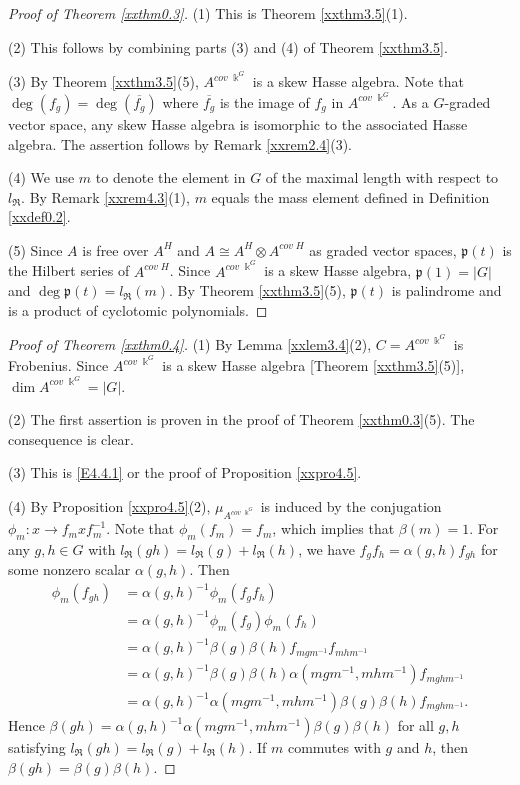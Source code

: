 \begin{proof}[Proof of Theorem \ref{xxthm0.3}]
(1) This is Theorem \ref{xxthm3.5}(1).

(2) This follows by combining parts (3) and (4) 
of Theorem \ref{xxthm3.5}.

(3) By Theorem \ref{xxthm3.5}(5), $A^{cov\; \Bbbk^G}$
is a skew Hasse algebra. Note that $\deg (f_g)=
\deg (\overline{f_g})$ where $\overline{f_g}$ is
the image of $f_g$ in $A^{cov\; \Bbbk^G}$. As a $G$-graded
vector space, any skew Hasse algebra is isomorphic to 
the associated Hasse algebra. The assertion follows
by Remark \ref{xxrem2.4}(3). 

(4) We use $m$ to denote the element in $G$ of the maximal
length with respect to ${l_{\Re}}$. By Remark \ref{xxrem4.3}(1),
$m$ equals the mass element defined in Definition \ref{xxdef0.2}.

(5) 
Since $A$ is free over $A^H$ and $A\cong A^H\otimes A^{cov\; H}$
as graded vector spaces, ${\mathfrak{p}}(t)$ is the Hilbert series of
$A^{cov\; H}$. Since $A^{cov\; \Bbbk^G}$ is a skew Hasse algebra,
${\mathfrak{p}}(1)=|G|$ and $\deg {\mathfrak{p}}(t)={l_{\Re}}(m)$. By Theorem \ref{xxthm3.5}(5),
${\mathfrak{p}}(t)$ is palindrome and is a product of cyclotomic
polynomials.
\end{proof}

\begin{proof}[Proof of Theorem \ref{xxthm0.4}]
(1) By Lemma \ref{xxlem3.4}(2), $C=A^{cov\; \Bbbk^G}$ is Frobenius.
Since $A^{cov\; \Bbbk^G}$ is a skew Hasse algebra 
[Theorem \ref{xxthm3.5}(5)], $\dim A^{cov\; \Bbbk^G}=|G|$.

(2) The first assertion is proven in the proof of Theorem \ref{xxthm0.3}(5).
The consequence is clear.

(3) This is \eqref{E4.4.1} or the proof of Proposition \ref{xxpro4.5}.

(4) By Proposition \ref{xxpro4.5}(2), $\mu_{A^{cov\; \Bbbk^G}}$ 
is induced by the conjugation $\phi_{m}: x\to f_{m} x f_{m}^{-1}$.
Note that $\phi_{m}(f_m)=f_{m}$, which implies that 
$\beta(m)=1$. For any $g,h\in G$ with ${l_{\Re}}(gh)={l_{\Re}}(g)+{l_{\Re}}(h)$,
we have $f_g f_{h}=\alpha(g,h) f_{gh}$ for some nonzero
scalar $\alpha(g,h)$. Then 
$$\begin{aligned}
\phi_{m}(f_{gh})&= \alpha(g,h)^{-1} \phi_{m}(f_g f_h)\\
&=\alpha(g,h)^{-1}\phi_{m}(f_g) \phi_{m}(f_h)\\
&=\alpha(g,h)^{-1}\beta(g) \beta(h) f_{mgm^{-1}} f_{mhm^{-1}}\\
&= \alpha(g,h)^{-1}\beta(g) \beta(h) \alpha(mgm^{-1}, mhm^{-1}) 
f_{mghm^{-1}}\\
&= \alpha(g,h)^{-1}\alpha(mgm^{-1}, mhm^{-1}) 
\beta(g) \beta(h) f_{mghm^{-1}}.
\end{aligned}
$$
Hence $\beta(gh)=\alpha(g,h)^{-1}\alpha(mgm^{-1}, mhm^{-1}) 
\beta(g) \beta(h)$ for all $g,h$ satisfying  ${l_{\Re}}(gh)={l_{\Re}}(g)+{l_{\Re}}(h)$.
If $m$ commutes with $g$ and $h$, then $\beta(gh)=\beta(g) \beta(h)$.
\end{proof}

